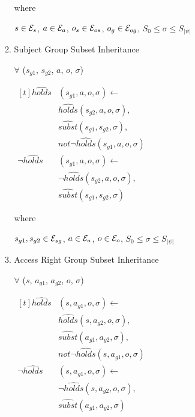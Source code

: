 \documentclass[global,twocolumn,draft]{svjour}
\begin{document}
\begin{itemize}
\begin{enumerate}
                  where
 
                  $s \in {\cal E}_{s}$,
                  $a \in {\cal E}_{a}$,
                  $o_{s} \in {\cal E}_{os}$,
                  $o_{g} \in {\cal E}_{og}$,
                  $S_{0}{\leq}{\sigma}{\leq}S_{|\psi|}$
 
                \item
                  Subject Group Subset Inheritance
 
                  $\forall$ ($s_{g1}$, $s_{g2}$, $a$, $o$, $\sigma$)

                  \begin{math}
                    \begin{aligned}[t]
                      \hat{holds}&(s_{g1}, a, o, \sigma) \leftarrow \\
                      & \hat{holds}(s_{g2}, a, o, \sigma), \\
                      & \hat{subst}(s_{g1}, s_{g2}, \sigma), \\
                      & not \lnot \hat{holds}(s_{g1}, a, o, \sigma) \\
                      \lnot \hat{holds}&(s_{g1}, a, o, \sigma) \leftarrow \\
                      & \lnot \hat{holds}(s_{g2}, a, o, \sigma), \\
                      & \hat{subst}(s_{g1}, s_{g2}, \sigma)
                    \end{aligned}
                  \end{math}
 
                  where
 
                  $s_{g1}, s_{g2} \in {\cal E}_{sg}$,
                  $a \in {\cal E}_{a}$,
                  $o \in {\cal E}_{o}$,
                  $S_{0} \leq \sigma \leq S_{|\psi|}$
 
                \item
                  Access Right Group Subset Inheritance
 
                  $\forall$ ($s$, $a_{g1}$, $a_{g2}$, $o$, $\sigma$)

                  \begin{math}
                    \begin{aligned}[t]
                      \hat{holds}&(s, a_{g1}, o, \sigma) \leftarrow \\
                      & \hat{holds}(s, a_{g2}, o, \sigma), \\
                      & \hat{subst}(a_{g1}, a_{g2}, \sigma), \\
                      & not \lnot \hat{holds}(s, a_{g1}, o, \sigma) \\
                      \lnot \hat{holds}&(s, a_{g1}, o, \sigma) \leftarrow \\
                      & \lnot \hat{holds}(s, a_{g2}, o, \sigma), \\
                      & \hat{subst}(a_{g1}, a_{g2}, \sigma)
                    \end{aligned}
                  \end{math}


\end{enumerate}
\end{itemize}
\end{document}
